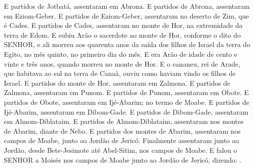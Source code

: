 {  E partidos de Jotbatá, assentaram em Abrona.
  E partidos de Abrona, assentaram em Eziom-Geber.
  E partidos de Eziom-Geber, assentaram no deserto de Zim, que é Cades.
  E partidos de Cades, assentaram no monte de Hor, na extremidade da terra de Edom.
  E subiu Arão o sacerdote ao monte de Hor, conforme o dito do SENHOR, e ali morreu aos quarenta anos da saída dos filhos de Israel da terra do Egito, no mês quinto, no primeiro dia do mês.
  E era Arão de idade de cento e vinte e três anos, quando morreu no monte de Hor.
  E o cananeu, rei de Arade, que habitava ao sul na terra de Canaã, ouviu como haviam vindo os filhos de Israel.
  E partidos do monte de Hor, assentaram em Zalmona.
  E partidos de Zalmona, assentaram em Punom.
  E partidos de Punom, assentaram em Obote.
  E partidos de Obote, assentaram em Ijé-Abarim; no termo de Moabe.
  E partidos de Ijé-Abarim, assentaram em Dibom-Gade.
  E partidos de Dibom-Gade, assentaram em Almom-Diblataim.
  E partidos de Almom-Diblataim, assentaram nos montes de Abarim, diante de Nebo.
  E partidos dos montes de Abarim, assentaram nos campos de Moabe, junto ao Jordão de Jericó.
  Finalmente assentaram junto ao Jordão, desde Bete-Jesimote até Abel-Sitim, nos campos de Moabe.
  E falou o SENHOR a Moisés nos campos de Moabe junto ao Jordão de Jericó, dizendo:
  .
\par }

